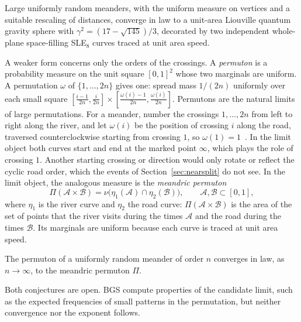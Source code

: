 \begin{conjecture}\label{conj:bgs}
Large uniformly random meanders, with the uniform measure on vertices and a suitable rescaling of
distances, converge in law to a unit-area Liouville quantum gravity sphere with
$\gamma^2=(17-\sqrt{145})/3$, decorated by two independent whole-plane space-filling SLE$_8$
curves traced at unit area speed.
\end{conjecture}

A weaker form concerns only the orders of the crossings. A \emph{permuton} is a
probability measure on the unit square $[0,1]^2$ whose two marginals are uniform. A permutation
$\omega$ of $\{1,\ldots,2n\}$ gives one: spread mass $1/(2n)$ uniformly over each small square
$[\frac{i-1}{2n},\frac{i}{2n}]\times[\frac{\omega(i)-1}{2n},\frac{\omega(i)}{2n}]$. Permutons are the
natural limits of large permutations. For a meander, number the crossings $1,\ldots,2n$ from left
to right along the river, and let $\omega(i)$ be the position of crossing $i$ along the road,
traversed counterclockwise starting from crossing $1$, so $\omega(1)=1$~\cite[Definition~1.6]{BGS}.
In the limit object both curves start and end at the marked point $\infty$, which plays the role of
crossing $1$. Another starting crossing or direction would only rotate or reflect the cyclic road
order, which the events of Section~\ref{sec:nearsplit} do not see. In the limit object, the analogous
measure is the \emph{meandric permuton}
\[
\Pi(\mathcal A\times\mathcal B)=\nu\bigl(\eta_1(\mathcal A)\cap\eta_2(\mathcal B)\bigr),\qquad \mathcal A,\mathcal B\subset[0,1],
\]
where $\eta_1$ is the river curve and $\eta_2$ the road curve: $\Pi(\mathcal A\times\mathcal B)$ is the area of the
set of points that the river visits during the times $\mathcal A$ and the road during the times $\mathcal B$. Its
marginals are uniform because each curve is traced at unit area speed.

\begin{conjecture}\label{conj:permuton}
The permuton of a uniformly random meander of order $n$ converges in law, as $n\to\infty$, to the
meandric permuton $\Pi$.
\end{conjecture}

Both conjectures are open. BGS compute properties of the candidate limit, such as the expected
frequencies of small patterns in the permutation, but neither convergence nor the exponent
follows.

